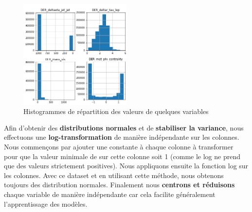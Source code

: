 \documentclass[12pt]{article}
\begin{document}
\begin{figure}[H]
    \center
    \includegraphics[width=0.5\textwidth]{images/histograms_sample.png}
    \caption{Histogrammes de répartition des valeurs de quelques variables}
    \label{img:hist-sample}
\end{figure}

Afin d’obtenir des \textbf{distributions normales} et de \textbf{stabiliser la
variance}, nous effectuons une \textbf{log-transformation} de manière
indépendante sur les colonnes. Nous commençons par ajouter une constante à
chaque colonne à transformer pour que la valeur minimale de sur cette colonne
soit 1 (comme le log ne prend que des valeurs strictement positives). Nous
appliquons ensuite la fonction log sur les colonnes. Avec ce dataset et en
utilisant cette méthode, nous obtenons toujours des distribution normales.
Finalement nous \textbf{centrons et réduisons} chaque variable de manière
indépendante car cela facilite généralement l’apprentissage des modèles. \\

\end{document}
